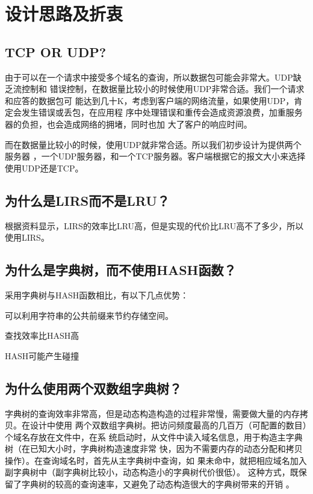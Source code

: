 %
%
\section{设计思路及折衷} 
\subsection{TCP OR UDP?}
由于可以在一个请求中接受多个域名的查询，所以数据包可能会非常大。UDP缺乏流控制和
错误控制，在数据量比较小的时候使用UDP非常合适。我们一个请求和应答的数据包可
能达到几十K，考虑到客户端的网络流量，如果使用UDP，肯定会发生错误或丢包，在应用程
序中处理错误和重传会造成资源浪费，加重服务器的负担，也会造成网络的拥堵，同时也加
大了客户的响应时间。
\par{而在数据量比较小的时候，使用UDP就非常合适。所以我们初步设计为提供两个服务器
，一个UDP服务器，和一个TCP服务器。客户端根据它的报文大小来选择使用UDP还是TCP。}
\subsection{为什么是LIRS而不是LRU？}
根据资料显示，LIRS的效率比LRU高，但是实现的代价比LRU高不了多少，所以使用LIRS。
\subsection{为什么是字典树，而不使用HASH函数？} 
采用字典树与HASH函数相比，有以下几点优势：
\begin{asparaenum}[1.]
\item{可以利用字符串的公共前缀来节约存储空间。} 
\item{查找效率比HASH高\cite{DATA}}
\item{HASH可能产生碰撞} 
\end{asparaenum}
\subsection{为什么使用两个双数组字典树？}
字典树的查询效率非常高，但是动态构造构造的过程非常慢，需要做大量的内存拷贝。在设计中使用
两个双数组字典树。把访问频度最高的几百万（可配置的数目）个域名存放在文件中，在系
统启动时，从文件中读入域名信息，用于构造主字典树（在已知大小时，字典树构造速度非常
快，因为不需要内存的动态分配和拷贝操作）。在查询域名时，首先从主字典树中查询，如
果未命中，就把相应域名加入副字典树中（副字典树比较小，动态构造小的字典树代价很低）。
这种方式，既保留了字典树的较高的查询速率，又避免了动态构造很大的字典树带来的开销
。

%
